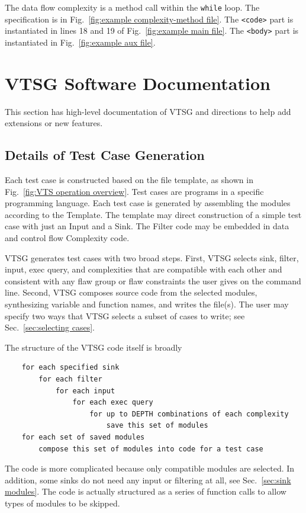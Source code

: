 The data flow complexity is a method call within the \verb|while| loop.
The specification
is in Fig.~\ref{fig:example complexity-method file}.
The \verb|<code>|
part is instantiated in lines 18 and 19 of
Fig.~\ref{fig:example main file}.
The \verb|<body>| part is instantiated in
Fig.~\ref{fig:example aux file}.

\section{VTSG Software Documentation}
\label{sec: high-level documentation}

This section has high-level documentation of VTSG and directions to help add
extensions or new features.

\subsection{Details of Test Case Generation}
\label{sec: generation detail}

Each test case is constructed based on the file template, as shown in
Fig.~\ref{fig:VTS operation overview}. Test cases are programs in a specific
programming language.  Each test case is generated by assembling the modules
according to the Template.  The template may direct construction of a simple
test case with just an Input and a Sink.  The Filter code may be embedded in
data and control flow Complexity code.

VTSG generates test cases with two broad steps.  First, VTSG selects sink,
filter, input, exec query, and complexities that are compatible with each other
and consistent with any flaw group or flaw constraints the user gives on the
command line.  Second, VTSG composes source code from the selected modules,
synthesizing variable and function names, and writes the file(s).  The user may
specify two ways that VTSG selects a subset of cases to write; see
Sec.~\ref{sec:selecting cases}.

The structure of the VTSG code itself is broadly
\begin{verbatim}
    for each specified sink
        for each filter
            for each input
                for each exec query
                    for up to DEPTH combinations of each complexity
                        save this set of modules
    for each set of saved modules
        compose this set of modules into code for a test case
\end{verbatim}
The code is more complicated because only compatible modules are
selected.
In addition, some sinks do not need any input or filtering at all,
see Sec.~\ref{sec:sink modules}.
The code is actually structured as a series of function calls to allow types
of modules to be skipped.

